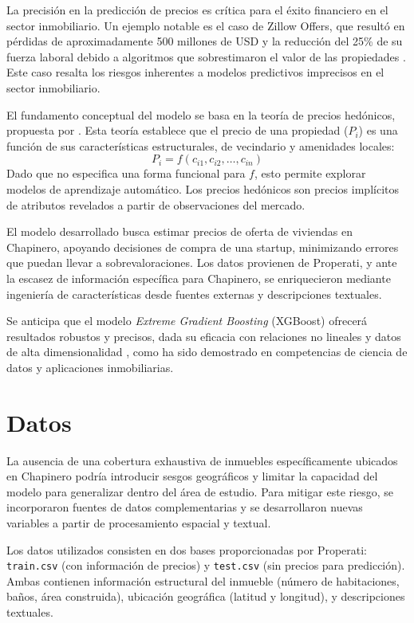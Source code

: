 \documentclass[12pt,a4paper,onecolumn]{article}
\begin{document}
La precisión en la predicción de precios es crítica para el éxito financiero en el sector inmobiliario. Un ejemplo notable es el caso de Zillow Offers, que resultó en pérdidas de aproximadamente 500 millones de USD y la reducción del 25\% de su fuerza laboral debido a algoritmos que sobrestimaron el valor de las propiedades \citep{zillow2021}. Este caso resalta los riesgos inherentes a modelos predictivos imprecisos en el sector inmobiliario.

El fundamento conceptual del modelo se basa en la teoría de precios hedónicos, propuesta por \citet{rosen1974}. Esta teoría establece que el precio de una propiedad ($P_i$) es una función de sus características estructurales, de vecindario y amenidades locales: 
\[
P_i = f(c_{i1}, c_{i2}, \ldots, c_{in})
\]
Dado que \citet{rosen1974} no especifica una forma funcional para $f$, esto permite explorar modelos de aprendizaje automático. Los precios hedónicos son precios implícitos de atributos revelados a partir de observaciones del mercado.

El modelo desarrollado busca estimar precios de oferta de viviendas en Chapinero, apoyando decisiones de compra de una startup, minimizando errores que puedan llevar a sobrevaloraciones. Los datos provienen de Properati, y ante la escasez de información específica para Chapinero, se enriquecieron mediante ingeniería de características desde fuentes externas y descripciones textuales.

Se anticipa que el modelo \textit{Extreme Gradient Boosting} (XGBoost) ofrecerá resultados robustos y precisos, dada su eficacia con relaciones no lineales y datos de alta dimensionalidad \citep{chen2016xgboost}, como ha sido demostrado en competencias de ciencia de datos y aplicaciones inmobiliarias.

\section{Datos}

La ausencia de una cobertura exhaustiva de inmuebles específicamente ubicados en Chapinero podría introducir sesgos geográficos y limitar la capacidad del modelo para generalizar dentro del área de estudio. Para mitigar este riesgo, se incorporaron fuentes de datos complementarias y se desarrollaron nuevas variables a partir de procesamiento espacial y textual.

Los datos utilizados consisten en dos bases proporcionadas por Properati: \texttt{train.csv} (con información de precios) y \texttt{test.csv} (sin precios para predicción). Ambas contienen información estructural del inmueble (número de habitaciones, baños, área construida), ubicación geográfica (latitud y longitud), y descripciones textuales.
\end{document}
